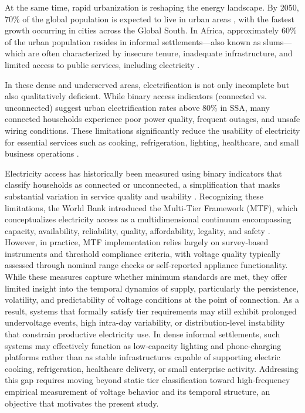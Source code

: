 \documentclass[review]{elsarticle}
\begin{document}
At the same time, rapid urbanization is reshaping the energy landscape. By 2050, 70\% of the global population is expected to live in urban areas \cite{broto2017energy, adams2018intra}, with the fastest growth 
occurring in cities across the Global South. In Africa, approximately 60\% of the urban population resides in informal settlements—also known as slums—which are often characterized by insecure tenure, inadequate infrastructure, and limited access to public services, including electricity \cite{Cabrita2024Preprint, Madzivhandila2024Climate, TodesGoodfellow2024, adams2017water}. 


In these dense and underserved areas, electrification is not only incomplete but also qualitatively deficient. While binary access indicators (connected vs. unconnected) suggest urban electrification rates above 80\% in SSA, many connected households experience poor power quality, frequent outages, and unsafe wiring conditions. These limitations significantly reduce the usability of electricity for essential services such as cooking, refrigeration, lighting, healthcare, and small business operations \cite{stevanato2023access, mensah2022electricity}. 

Electricity access has historically been measured using binary indicators that classify households as  connected or unconnected, a simplification that masks substantial variation in service quality and usability \cite{WorldBankESMAP2018, IEA2023Electricity}. Recognizing these limitations, the World Bank introduced the Multi-Tier Framework (MTF), which conceptualizes electricity access as a multidimensional continuum encompassing capacity, availability, reliability, quality, affordability, legality, and safety \cite{BhatiaAngelou2015}. However, in practice, MTF implementation relies largely on survey-based instruments and threshold compliance criteria, with voltage quality typically assessed through nominal range checks or self-reported appliance functionality. While these measures capture whether minimum standards are met, they offer limited insight into the temporal dynamics of supply, particularly the persistence, volatility, and predictability of voltage conditions at the point of connection. As a result, systems that formally satisfy tier requirements may still exhibit prolonged undervoltage events, high intra-day variability, or distribution-level instability that constrain productive electricity use. In dense informal settlements, such systems may effectively function as low-capacity lighting and phone-charging platforms rather than as stable infrastructures capable of supporting electric cooking, refrigeration, healthcare delivery, or small enterprise activity. Addressing this gap requires moving beyond static tier classification toward high-frequency empirical measurement of voltage behavior and its temporal structure, an objective that motivates the present study.
\end{document}
